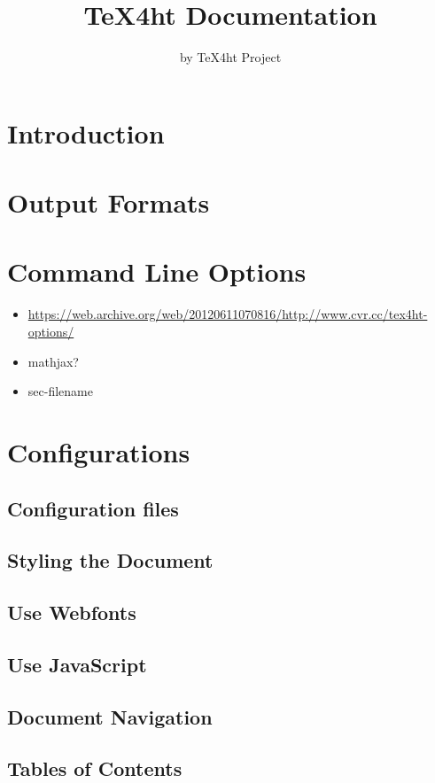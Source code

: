 \documentclass{book}
\title{TeX4ht Documentation}
\author{by TeX4ht Project}
\begin{document}
\maketitle
\tableofcontents


\chapter{Introduction}

\chapter{Output Formats}
\chapter{Command Line Options}

\begin{itemize}
  \item \url{https://web.archive.org/web/20120611070816/http://www.cvr.cc/tex4ht-options/}
  \item mathjax?
  \item sec-filename
\end{itemize}

\chapter{Configurations}
\section{Configuration files}
\section{Styling the Document}
\section{Use Webfonts}
\section{Use JavaScript}
\section{Document Navigation}
\section{Tables of Contents}
\end{document}
